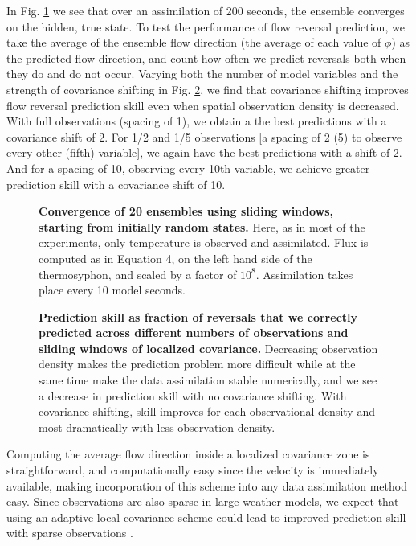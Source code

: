 \documentclass[10pt,letterpaper]{article}
\begin{document}
In Fig. \ref{fig:sliding_spag} we see that over an assimilation of 200 seconds, the ensemble converges on the hidden, true state.
To test the performance of flow reversal prediction, we take the average of the ensemble flow direction (the average of each value of $\phi$) as the predicted flow direction, and count how often we predict reversals both when they do and do not occur.
Varying both the number of model variables and the strength of covariance shifting in Fig. \ref{fig:sliding_results}, we find that covariance shifting improves flow reversal prediction skill even when spatial observation density is decreased.
With full observations (spacing of 1), we obtain a the best predictions with a covariance shift of 2.
For 1/2 and 1/5 observations [a spacing of 2 (5) to observe every other (fifth) variable], we again have the best predictions with a shift of 2.
And for a spacing of 10, observing every 10th variable, we achieve greater prediction skill with a covariance shift of 10.

\begin{figure}[h]
  \centering
  \caption[]{
\textbf{    Convergence of 20 ensembles using sliding windows, starting from initially random states.
}    Here, as in most of the experiments, only temperature is observed and assimilated.
    Flux is computed as in Equation 4, on the left hand side of the thermosyphon, and scaled by a factor of $10^8$.
    Assimilation takes place every 10 model seconds.
  }
  \label{fig:sliding_spag}
\end{figure}

\begin{figure}[h]
  \centering
  \caption[]{
\textbf{    Prediction skill as fraction of reversals that we correctly predicted across different numbers of observations and sliding windows of localized covariance.
}    Decreasing observation density makes the prediction problem more difficult while at the same time make the data assimilation stable numerically, and we see a decrease in prediction skill with no covariance shifting.
    With covariance shifting, skill improves for each observational density and most dramatically with less observation density.
  }
  \label{fig:sliding_results}
\end{figure}

Computing the average flow direction inside a localized covariance zone is straightforward, and computationally easy since the velocity is immediately available, making incorporation of this scheme into any data assimilation method easy.
Since observations are also sparse in large weather models, we expect that using an adaptive local covariance scheme could lead to improved prediction skill with sparse observations \cite{bishop2011a}.
\end{document}
